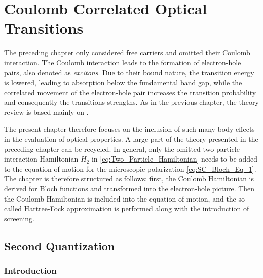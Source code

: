 %

\chapter{Coulomb Correlated Optical Transitions}

\label{cha:Coulomb_Correlated_Optical_Transitions}The preceding chapter
only considered free carriers and omitted their Coulomb interaction.
The Coulomb interaction leads to the formation of electron-hole pairs,
also denoted as \emph{excitons}. Due to their bound nature, the transition
energy is lowered, leading to absorption below the fundamental band
gap, while the correlated movement of the electron-hole pair increases
the transition probability and consequently the transitions strengths.
As in the previous chapter, the theory review is based mainly on \citet{Chuang1995,Jackson1998,Chow,Haug2009,Schafer2002}.

The present chapter therefore focuses on the inclusion of such many
body effects in the evaluation of optical properties. A large part
of the theory presented in the preceding chapter can be recycled.
In general, only the omitted two-particle interaction Hamiltonian
$H_{2}$ in \ref{eq:Two_Particle_Hamiltonian} needs to be added to
the equation of motion for the microscopic polarization \ref{eq:SC_Bloch_Eq_1}.
The chapter is therefore structured as follows: first, the Coulomb
Hamiltonian is derived for Bloch functions and transformed into the
electron-hole picture. Then the Coulomb Hamiltonian is included into
the equation of motion, and the so called Hartree-Fock approximation
is performed along with the introduction of screening.


\section{Second Quantization}


\subsection{Introduction}

